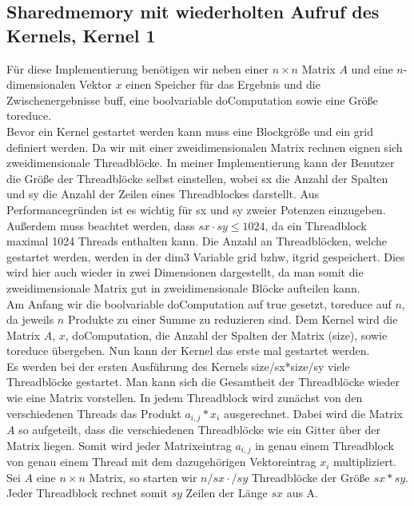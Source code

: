 \documentclass[10pt,a4paper]{article}
\begin{document}
	\subsection{Sharedmemory mit wiederholten Aufruf des Kernels, Kernel 1}
	Für diese Implementierung benötigen wir neben einer $n\times n$ Matrix $A$ und eine $n$-dimensionalen Vektor $x$ einen Speicher für das Ergebnis und die Zwischenergebnisse buff, eine boolvariable doComputation sowie eine Größe toreduce.\\
	Bevor ein Kernel gestartet werden kann muss eine Blockgröße und ein grid definiert werden.
	Da wir mit einer zweidimensionalen Matrix rechnen eignen sich zweidimensionale Threadblöcke.
	In meiner Implementierung kann der Benutzer die Größe der Threadblöcke selbst einstellen, wobei sx die Anzahl der Spalten und sy die Anzahl der Zeilen eines Threadblockes darstellt.
	Aus Performancegründen ist es wichtig für sx und sy zweier Potenzen einzugeben. Außerdem muss beachtet werden, dass $sx\cdot sy\leq 1024$, da ein Threadblock maximal 1024 Threads enthalten kann. Die Anzahl an Threadblöcken, welche gestartet werden, werden in der dim3 Variable grid bzhw, itgrid gespeichert. Dies wird hier auch wieder in zwei Dimensionen dargestellt, da man somit die zweidimensionale Matrix gut in zweidimensionale Blöcke aufteilen kann. \\ 
	Am Anfang wir die boolvariable doComputation auf true gesetzt, toreduce auf $n$, da jeweils $n$ Produkte zu einer Summe zu reduzieren sind. Dem Kernel wird die Matrix $A$, $x$, doComputation, die Anzahl der Spalten der Matrix (size), sowie toreduce übergeben. Nun kann der Kernel das erste mal gestartet werden.\\
	Es werden bei der ersten Ausführung des Kernels size/sx*size/sy viele Threadblöcke gestartet. Man kann sich die Gesamtheit der Threadblöcke wieder wie eine Matrix vorstellen. In jedem Threadblock wird zunächst von den verschiedenen Threads das Produkt $a_{i,j}*x_i$ ausgerechnet. Dabei wird die Matrix $A$ so aufgeteilt, dass die verschiedenen Threadblöcke wie ein Gitter über der Matrix liegen. Somit wird jeder Matrixeintrag $a_{i,j}$ in genau einem Threadblock von genau einem Thread mit dem dazugehörigen Vektoreintrag $x_i$ multipliziert. Sei $A$ eine $n\times n$ Matrix, so starten wir $n/sx \cdot /sy$ Threadblöcke der Größe $sx*sy$. Jeder Threadblock rechnet somit $sy$ Zeilen der Länge $sx$ aus A. 
\end{document}
